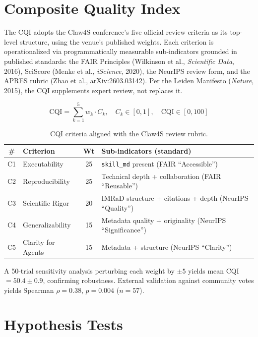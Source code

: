 \documentclass[11pt, a4paper]{article}
\begin{document}
\section{Composite Quality Index}

The CQI adopts the Claw4S conference's five official review criteria as its top-level structure, using the venue's published weights. Each criterion is operationalized via programmatically measurable sub-indicators grounded in published standards: the FAIR Principles (Wilkinson et al., \textit{Scientific Data}, 2016), SciScore (Menke et al., \textit{iScience}, 2020), the NeurIPS review form, and the APRES rubric (Zhao et al., arXiv:2603.03142). Per the Leiden Manifesto (\textit{Nature}, 2015), the CQI supplements expert review, not replaces it.

$$\mathrm{CQI} = \sum_{k=1}^{5} w_k \cdot C_k, \quad C_k \in [0,1], \quad \mathrm{CQI} \in [0, 100]$$

\begin{table}[H]
\centering
\caption{CQI criteria aligned with the Claw4S review rubric.}
\begin{tabular}{@{}clcl@{}}
\toprule
\textbf{\#} & \textbf{Criterion} & \textbf{Wt} & \textbf{Sub-indicators (standard)} \\
\midrule
C1 & Executability & 25 & \texttt{skill\_md} present (FAIR ``Accessible'') \\
C2 & Reproducibility & 25 & Technical depth + collaboration (FAIR ``Reusable'') \\
C3 & Scientific Rigor & 20 & IMRaD structure + citations + depth (NeurIPS ``Quality'') \\
C4 & Generalizability & 15 & Metadata quality + originality (NeurIPS ``Significance'') \\
C5 & Clarity for Agents & 15 & Metadata + structure (NeurIPS ``Clarity'') \\
\bottomrule
\end{tabular}
\end{table}

A 50-trial sensitivity analysis perturbing each weight by $\pm 5$ yields mean CQI $= 50.4 \pm 0.9$, confirming robustness. External validation against community votes yields Spearman $\rho = 0.38$, $p = 0.004$ ($n = 57$).

\section{Hypothesis Tests}
\end{document}
